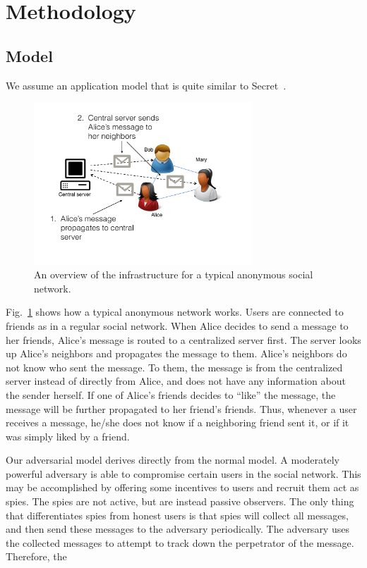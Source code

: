 \section{Methodology}

\subsection{Model}

We assume an application model that is quite similar to Secret~\cite{secret}.

\begin{figure}
\centering
\includegraphics[height = 2.4in]{figures/secret_infrastructure}
\caption{An overview of the infrastructure for a typical anonymous social network.}
\label{fig:secret_infrastructure}
\end{figure}

Fig.~\ref{fig:secret_infrastructure} shows how a typical anonymous network works. Users are connected to friends as in a regular social network. When Alice decides to send a message to her friends, Alice's message is routed to a centralized server first. The server looks up Alice's neighbors and propagates the message to them. Alice's neighbors do not know who sent the message. To them, the message is from the centralized server instead of directly from Alice, and does not have any information about the sender herself. If one of Alice's friends decides to ``like'' the message, the message will be further propagated to her friend's friends. Thus, whenever a user receives a message, he/she does not know if a neighboring friend sent it, or if it was simply liked by a friend.

Our adversarial model derives directly from the normal model. A moderately powerful adversary is able to compromise certain users in the social network. This may be accomplished by offering some incentives to users and recruit them act as spies. The spies are not active, but are instead passive observers. The only thing that differentiates spies from honest users is that spies will collect all messages, and then send these messages to the adversary periodically. The adversary uses the collected messages to attempt to track down the perpetrator of the message. Therefore, the 

